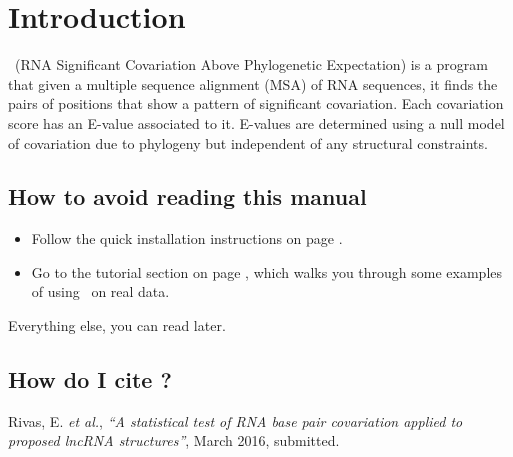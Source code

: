 \section{Introduction}
\setcounter{footnote}{0}

\rscape\ (RNA Significant Covariation Above Phylogenetic Expectation)
is a program that given a multiple sequence alignment (MSA) of RNA
sequences, it finds the pairs of positions that show a pattern of
significant covariation. Each covariation score has an E-value
associated to it. E-values are determined using a null model of
covariation due to phylogeny but independent of any structural
constraints. 

\subsection{How to avoid reading this manual}

\begin{itemize}
\item Follow the quick installation instructions on page
      \pageref{section:installation}. 
\item Go to the tutorial section on page
\pageref{section:tutorial}, which walks you through some examples of
using \rscape\ on real data.
\end{itemize}

Everything else, you can read later.



\subsection{How do I cite \rscape?}

Rivas, E. \textit{et al.}, \textit{``A statistical test of RNA base pair
  covariation applied to proposed lncRNA structures''}, March 2016, submitted.













  









